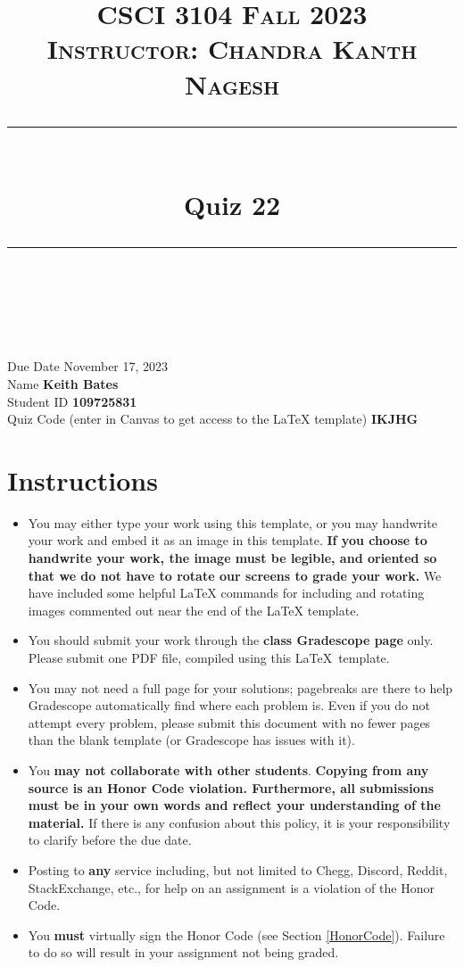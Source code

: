 \documentclass[11pt]{article}
\title{
\normalfont \normalsize 
\textsc{CSCI 3104 Fall 2023 \\ 
Instructor: Chandra Kanth Nagesh} \\
[10pt] 
\rule{\linewidth}{0.5pt} \\[6pt] 
\huge Quiz 22 \\
\rule{\linewidth}{2pt}  \\[10pt]
}
\date{}
\theoremstyle{definition}
\theoremstyle{definition}
\theoremstyle{definition}
\begin{document}

\maketitle


\noindent
Due Date \dotfill November 17, 2023 \\
Name \dotfill \textbf{Keith Bates} \\
Student ID \dotfill \textbf{109725831} \\
Quiz Code (enter in Canvas to get access to the LaTeX template) \dotfill \textbf{IKJHG}


\tableofcontents

\section*{Instructions}
 \begin{itemize}
	\item You may either type your work using this template, or you may handwrite your work and embed it as an image in this template. \textbf{If you choose to handwrite your work, the image must be legible, and oriented so that we do not have to rotate our screens to grade your work.} We have included some helpful LaTeX commands for including and rotating images commented out near the end of the LaTeX template.
	\item You should submit your work through the \textbf{class Gradescope page} only. Please submit one PDF file, compiled using this \LaTeX \ template.
	\item You may not need a full page for your solutions; pagebreaks are there to help Gradescope automatically find where each problem is. Even if you do not attempt every problem, please submit this document with no fewer pages than the blank template (or Gradescope has issues with it).

	\item You \textbf{may not collaborate with other students}. \textbf{Copying from any source is an Honor Code violation. Furthermore, all submissions must be in your own words and reflect your understanding of the material.} If there is any confusion about this policy, it is your responsibility to clarify before the due date. 

	\item Posting to \textbf{any} service including, but not limited to Chegg, Discord, Reddit, StackExchange, etc., for help on an assignment is a violation of the Honor Code.

	\item You \textbf{must} virtually sign the Honor Code (see Section \ref{HonorCode}). Failure to do so will result in your assignment not being graded.
\end{itemize}
\end{document}
